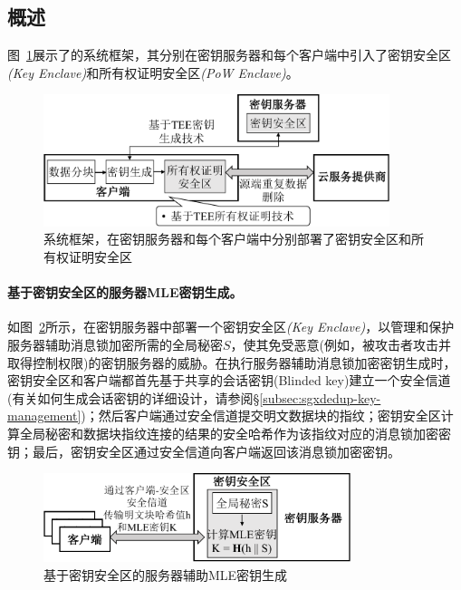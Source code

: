 \subsection{概述}
\label{subsec:sgxdedup-arch}

图~\ref{fig:sgxdedup-overview}展示了\sysnameS 的系统框架，其分别在密钥服务器和每个客户端中引入了密钥安全区\textit{(Key Enclave)}和所有权证明安全区\textit{(PoW Enclave)}。

\begin{figure}[!htb]
    \centering
    \includegraphics[width=0.9\textwidth]{pic/sgxdedup/sgxdedup-arch.pdf}
    \caption{\sysnameS 系统框架，在密钥服务器和每个客户端中分别部署了密钥安全区和所有权证明安全区}
    \label{fig:sgxdedup-overview}
\end{figure}

\paragraph*{基于密钥安全区的服务器MLE密钥生成。}如图~\ref{fig:sgxdedup-overview-key}所示，\sysnameS 在密钥服务器中部署一个密钥安全区\textit{(Key Enclave)}，以管理和保护服务器辅助消息锁加密所需的全局秘密$S$，使其免受恶意(例如，被攻击者攻击并取得控制权限)的密钥服务器的威胁。在执行服务器辅助消息锁加密密钥生成时，密钥安全区和客户端都首先基于共享的会话密钥(Blinded key)建立一个安全信道(有关如何生成会话密钥的详细设计，请参阅\S\ref{subsec:sgxdedup-key-management})；然后客户端通过安全信道提交明文数据块的指纹；密钥安全区计算全局秘密和数据块指纹连接的结果的安全哈希作为该指纹对应的消息锁加密密钥；最后，密钥安全区通过安全信道向客户端返回该消息锁加密密钥。

\begin{figure}[!htb]
    \centering
    \includegraphics[width=0.8\textwidth]{pic/sgxdedup/key-enclave.pdf}
    \caption{基于密钥安全区的服务器辅助MLE密钥生成}
    \label{fig:sgxdedup-overview-key}
\end{figure}

